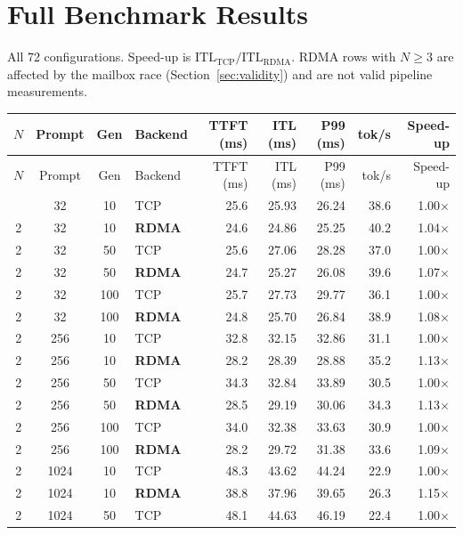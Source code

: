\documentclass[11pt,a4paper]{article}
\begin{document}
\appendix
\section{Full Benchmark Results}
\label{app:results}
All 72 configurations. Speed-up is $\text{ITL}_{\text{TCP}} / \text{ITL}_{\text{RDMA}}$. RDMA rows with $N \ge 3$ are affected by the mailbox race (Section~\ref{sec:validity}) and are not valid pipeline measurements.

{\small
\begin{longtable}{@{}ccclrrrrr@{}}
\toprule
$N$ & Prompt & Gen & Backend & TTFT (ms) & ITL (ms) & P99 (ms) & tok/s & Speed-up \\
\midrule
\endfirsthead
\toprule
$N$ & Prompt & Gen & Backend & TTFT (ms) & ITL (ms) & P99 (ms) & tok/s & Speed-up \\
\midrule
\endhead
\bottomrule
\endfoot
2 & 32 & 10 & TCP & 25.6 & 25.93 & 26.24 & 38.6 & 1.00$\times$ \\
2 & 32 & 10 & \textbf{RDMA} & 24.6 & 24.86 & 25.25 & 40.2 & 1.04$\times$ \\
2 & 32 & 50 & TCP & 25.6 & 27.06 & 28.28 & 37.0 & 1.00$\times$ \\
2 & 32 & 50 & \textbf{RDMA} & 24.7 & 25.27 & 26.08 & 39.6 & 1.07$\times$ \\
2 & 32 & 100 & TCP & 25.7 & 27.73 & 29.77 & 36.1 & 1.00$\times$ \\
2 & 32 & 100 & \textbf{RDMA} & 24.8 & 25.70 & 26.84 & 38.9 & 1.08$\times$ \\
\midrule
2 & 256 & 10 & TCP & 32.8 & 32.15 & 32.86 & 31.1 & 1.00$\times$ \\
2 & 256 & 10 & \textbf{RDMA} & 28.2 & 28.39 & 28.88 & 35.2 & 1.13$\times$ \\
2 & 256 & 50 & TCP & 34.3 & 32.84 & 33.89 & 30.5 & 1.00$\times$ \\
2 & 256 & 50 & \textbf{RDMA} & 28.5 & 29.19 & 30.06 & 34.3 & 1.13$\times$ \\
2 & 256 & 100 & TCP & 34.0 & 32.38 & 33.63 & 30.9 & 1.00$\times$ \\
2 & 256 & 100 & \textbf{RDMA} & 28.2 & 29.72 & 31.38 & 33.6 & 1.09$\times$ \\
\midrule
2 & 1024 & 10 & TCP & 48.3 & 43.62 & 44.24 & 22.9 & 1.00$\times$ \\
2 & 1024 & 10 & \textbf{RDMA} & 38.8 & 37.96 & 39.65 & 26.3 & 1.15$\times$ \\
2 & 1024 & 50 & TCP & 48.1 & 44.63 & 46.19 & 22.4 & 1.00$\times$ \\

\end{longtable}}
\end{document}
